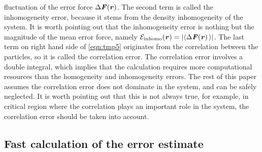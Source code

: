 \documentclass[aps, pre, preprint]{revtex4}
\renewcommand{\v}[1]{\textbf{\textit{#1}}}
\begin{document}
fluctuation of the error force $\Delta\v F(\v r)$.  The second term is
called the inhomogeneity error, because it stems from the density
inhomogeneity of the system. It is worth pointing out that the
inhomogeneity error is nothing but the magnitude of the mean error force,
namely $\mathcal E_{\textrm{inhomo}}(\v r) = \vert\langle\Delta\v F(\v
r)\,\rangle\vert$.  The last term on right hand side of \eqref{eqn:tmp5} originates from the
correlation between the particles, so it is called the correlation
error.
The correlation error involves a double integral, which
implies that the calculation  requires more computational resources
than the homogeneity and inhomogeneity errors.
The rest of this paper
assumes the 
correlation error does not dominate in the system, and can be safely
neglected.
It is worth pointing out that this is not always true, for example, in
critical region where the correlation plays an important role in the system,
the correlation error should be taken into account.


\subsection{Fast calculation of the error estimate}\label{sec:tmp1.3}
\end{document}
